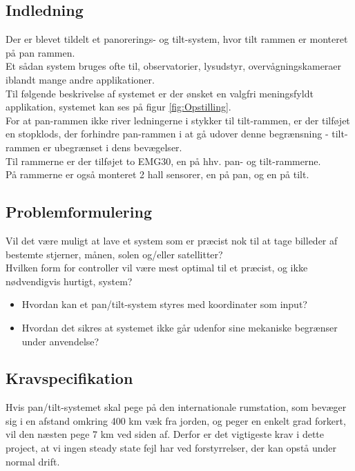 \subsection{Indledning}
Der er blevet tildelt et panorerings- og tilt-system, hvor tilt rammen er monteret på pan rammen.\\
Et sådan system bruges ofte til, observatorier, lysudstyr, overvågningskameraer iblandt mange andre applikationer.\\
Til følgende beskrivelse af systemet er der ønsket en valgfri meningsfyldt applikation, systemet kan ses på figur \ref{fig:Opstilling}.\\
For at pan-rammen ikke river ledningerne i stykker til tilt-rammen, er der tilføjet en stopklods, der forhindre pan-rammen i at gå udover denne begrænsning - tilt-rammen er ubegrænset i dens bevægelser.\\
Til rammerne er der tilføjet to EMG30\cite{emg30Data}, en på hhv. pan- og tilt-rammerne.\\
På rammerne er også monteret 2 hall sensorer, en på pan, og en på tilt. 


\subsection{Problemformulering}

Vil det være muligt at lave et system som er præcist nok til at tage billeder af bestemte stjerner, månen, solen og/eller satellitter?\\
Hvilken form for controller vil være mest optimal til et præcist, og ikke nødvendigvis hurtigt, system?

\begin{itemize}
	\item Hvordan kan et pan/tilt-system styres med koordinater som input?
	\item Hvordan det sikres at systemet ikke går udenfor sine mekaniske begrænser under anvendelse?
\end{itemize}

\subsection{Kravspecifikation}

Hvis pan/tilt-systemet skal pege på den internationale rumstation, som bevæger sig i en afstand omkring 400 km væk fra jorden, og peger en enkelt grad forkert, vil den næsten pege 7 km ved siden af. Derfor er det vigtigeste krav i dette project, at vi ingen steady state fejl har ved forstyrrelser, der kan opstå under normal drift.

